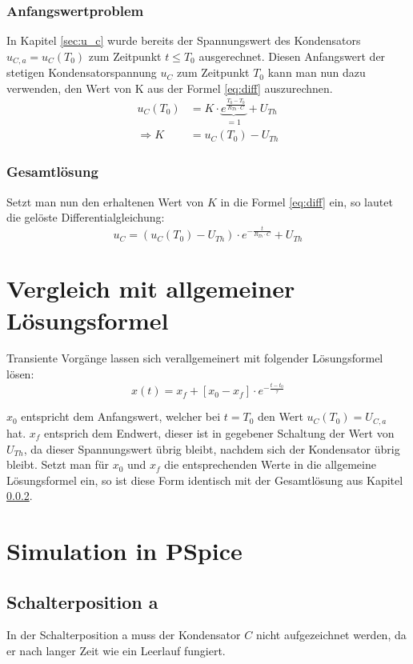 \documentclass[11pt]{scrartcl}
\begin{document}
\subsubsection{Anfangswertproblem}
In Kapitel \ref{sec:u_c} wurde bereits der Spannungswert des Kondensators $u_{C,a} = u_C(T_0)$ zum Zeitpunkt $t \leq T_0$ ausgerechnet.
Diesen Anfangswert der stetigen Kondensatorspannung $u_C$ zum Zeitpunkt $T_0$ kann man nun dazu verwenden,
den Wert von K aus der Formel \ref{eq:diff} auszurechnen.
\begin{align*}
  u_C (T_0) &= K \cdot \underbrace{e^{\frac{T_0 - T_0}{R_{Th}\cdot C}}}_{=1} + U_{Th} \\
  \Longrightarrow K &= u_C (T_0) - U_{Th}
\end{align*}

\subsubsection{Gesamtlösung}\label{sec:sol}
Setzt man nun den erhaltenen Wert von $K$ in die Formel \ref{eq:diff} ein, so lautet die gelöste Differentialgleichung:
\begin{equation*}
  u_C = (u_C(T_0) - U_{Th}) \cdot e^{-\frac{t}{R_{Th}\cdot C}} + U_{Th}
\end{equation*}

\section{Vergleich mit allgemeiner Lösungsformel}
Transiente Vorgänge lassen sich verallgemeinert mit folgender Lösungsformel lösen:
\begin{equation*}
  x(t) = x_f + \left[ x_0 - x_f \right] \cdot e^{-\frac{t-t_0}{\tau}}
\end{equation*}

$x_0$ entspricht dem Anfangswert, welcher bei $t=T_0$ den Wert $u_C(T_0) = U_{C,a}$ hat.
$x_f$ entsprich dem Endwert, dieser ist in gegebener Schaltung der Wert von $U_{Th}$, da dieser Spannungswert übrig bleibt,
nachdem sich der Kondensator übrig bleibt.
Setzt man für $x_0$ und $x_f$ die entsprechenden Werte in die allgemeine Lösungsformel ein,
so ist diese Form identisch mit der Gesamtlösung aus Kapitel \ref{sec:sol}.
\section{Simulation in PSpice}
\subsection{Schalterposition a}
In der Schalterposition a muss der Kondensator $C$ nicht aufgezeichnet werden, da er nach langer Zeit wie ein Leerlauf fungiert.
\end{document}
